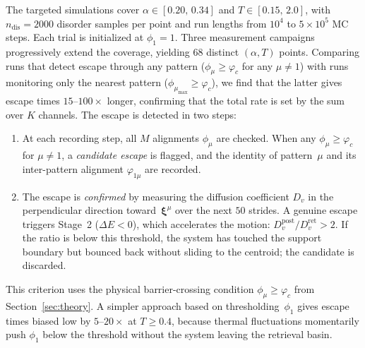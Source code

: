\documentclass[11pt]{article}
\newcommand{\bxi}{\boldsymbol{\xi}}
\begin{document}
The targeted simulations cover $\alpha \in [0.20,\, 0.34]$ and $T \in [0.15,\, 2.0]$, with $n_{\mathrm{dis}} = 2000$ disorder samples per point and run lengths from $10^4$ to $5 \times 10^5$ MC steps.  Each trial is initialized at $\phi_1 = 1$.  Three measurement campaigns progressively extend the coverage, yielding $68$ distinct $(\alpha, T)$ points.  Comparing runs that detect escape through any pattern ($\phi_\mu \geq \varphi_c$ for any $\mu \neq 1$) with runs monitoring only the nearest pattern ($\phi_{\mu_{\max}} \geq \varphi_c$), we find that the latter gives escape times $15$--$100\times$ longer, confirming that the total rate is set by the sum over $K$ channels.  The escape is detected in two steps:
\begin{enumerate}[nosep, leftmargin=*]
\item At each recording step, all $M$ alignments $\phi_\mu$ are checked.  When any $\phi_\mu \geq \varphi_c$ for $\mu \neq 1$, a \emph{candidate escape} is flagged, and the identity of pattern~$\mu$ and its inter-pattern alignment $\varphi_{1\mu}$ are recorded.
\item The escape is \emph{confirmed} by measuring the diffusion coefficient $D_v$ in the perpendicular direction toward~$\bxi^\mu$ over the next $50$ strides.  A genuine escape triggers Stage~2 ($\Delta E < 0$), which accelerates the motion: $D_v^{\mathrm{post}} / D_v^{\mathrm{ret}} > 2$.  If the ratio is below this threshold, the system has touched the support boundary but bounced back without sliding to the centroid; the candidate is discarded.
\end{enumerate}
This criterion uses the physical barrier-crossing condition $\phi_\mu \geq \varphi_c$ from Section~\ref{sec:theory}.  A simpler approach based on thresholding~$\phi_1$ gives escape times biased low by $5$--$20\times$ at $T \geq 0.4$, because thermal fluctuations momentarily push $\phi_1$ below the threshold without the system leaving the retrieval basin.
\end{document}
